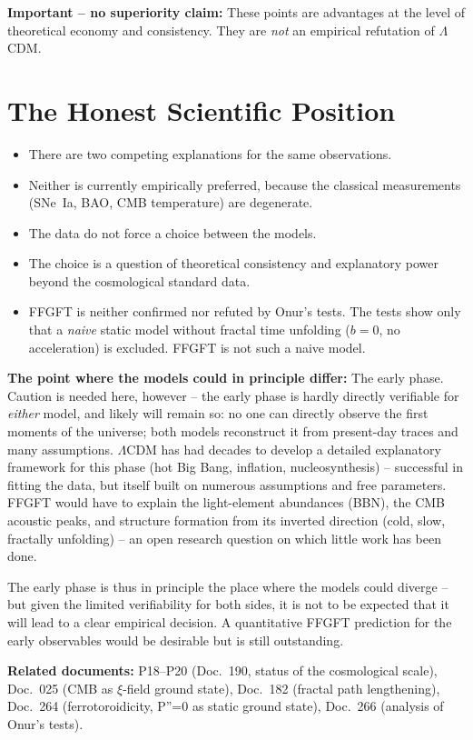 \textbf{Important -- no superiority claim:} These points are advantages at
the level of theoretical economy and consistency. They are \emph{not} an
empirical refutation of $\Lambda$CDM.

\section{The Honest Scientific Position}

\begin{itemize}
  \item There are two competing explanations for the same observations.
  \item Neither is currently empirically preferred, because the classical
        measurements (SNe~Ia, BAO, CMB temperature) are degenerate.
  \item The data do not force a choice between the models.
  \item The choice is a question of theoretical consistency and explanatory
        power beyond the cosmological standard data.
  \item FFGFT is neither confirmed nor refuted by Onur's tests. The tests
        show only that a \emph{naive} static model without fractal time
        unfolding ($b = 0$, no acceleration) is excluded. FFGFT is not such
        a naive model.
\end{itemize}

\textbf{The point where the models could in principle differ:} The early
phase. Caution is needed here, however -- the early phase is hardly directly
verifiable for \emph{either} model, and likely will remain so: no one can
directly observe the first moments of the universe; both models reconstruct
it from present-day traces and many assumptions. $\Lambda$CDM has had decades
to develop a detailed explanatory framework for this phase (hot Big Bang,
inflation, nucleosynthesis) -- successful in fitting the data, but itself
built on numerous assumptions and free parameters. FFGFT would have to
explain the light-element abundances (BBN), the CMB acoustic peaks, and
structure formation from its inverted direction (cold, slow, fractally
unfolding) -- an open research question on which little work has been done.

The early phase is thus in principle the place where the models could
diverge -- but given the limited verifiability for both sides, it is not to
be expected that it will lead to a clear empirical decision. A quantitative
FFGFT prediction for the early observables would be desirable but is still
outstanding.

\noindent\textbf{Related documents:} P18--P20 (Doc.~190, status of the
cosmological scale), Doc.~025 (CMB as $\xi$-field ground state), Doc.~182
(fractal path lengthening), Doc.~264 (ferrotoroidicity, P''=0 as static
ground state), Doc.~266 (analysis of Onur's tests).
